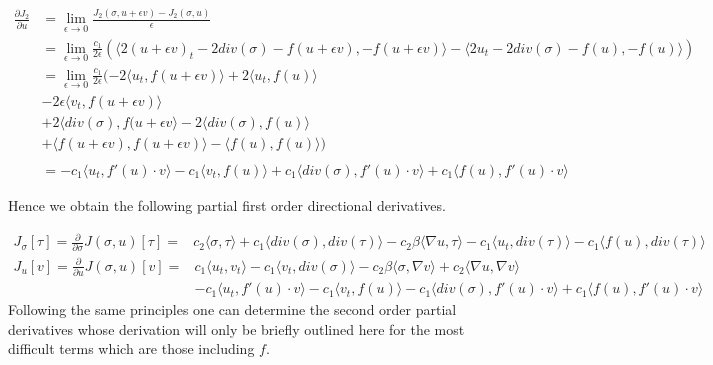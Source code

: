 \documentclass[../draft_1.tex]{subfiles}
\begin{document}
\begin{equation}
\begin{aligned}
\frac{\partial J_2}{\partial u} &= \lim_{\epsilon \rightarrow 0} \frac{J_2(\sigma, u + \epsilon v) - J_2(\sigma, u)}{\epsilon}  \\
&= \lim_{\epsilon \rightarrow 0} \frac{c_1}{2 \epsilon} (\langle 2(u+ \epsilon v)_t - 2 div(\sigma) - f(u + \epsilon v), - f(u + \epsilon v) \rangle - \langle 2u_t - 2 div(\sigma) - f(u), -f(u) \rangle) \\
&= \lim_{\epsilon \rightarrow 0} \frac{c_1}{2 \epsilon}  (-2 \langle u_t, f(u+ \epsilon v) \rangle + 2 \langle u_t, f(u) \rangle \\
& - 2 \epsilon \langle v_t, f(u+ \epsilon v) \rangle \\
&+ 2 \langle div(\sigma), f(u + \epsilon v \rangle - 2 \langle div(\sigma), f(u) \rangle \\
&+ \langle f(u+ \epsilon v), f(u + \epsilon v) \rangle - \langle f(u), f(u) \rangle) \\
\\
&= - c_1 \langle u_t, f'(u) \cdot v \rangle - c_1 \langle v_t, f(u) \rangle + c_1 \langle div(\sigma), f'(u) \cdot v \rangle + c_1 \langle f(u), f'(u) \cdot v \rangle
\end{aligned}
\end{equation}

Hence we obtain the following partial first order directional derivatives. 

\begin{equation}
\begin{aligned}
J_{\sigma}[\tau] = \frac{\partial}{\partial \sigma}J(\sigma, u)[\tau] =& c_2 \langle \sigma, \tau \rangle + c_1 \langle div(\sigma), div(\tau) \rangle - c_2 \beta \langle \nabla u, \tau \rangle - c_1 \langle u_t, div(\tau) \rangle - c_1 \langle f(u), div(\tau) \rangle
\end{aligned}
\end{equation}
\begin{equation}
\begin{aligned}
J_{u} [v]= \frac{\partial}{\partial u} J(\sigma, u)[v] =&  c_1 \langle u_t, v_t \rangle - c_1 \langle v_t, div(\sigma) \rangle - c_2 \beta \langle \sigma, \nabla v \rangle + c_2 \langle \nabla u, \nabla v \rangle  \\  
&- c_1 \langle u_t, f'(u) \cdot v \rangle  - c_1 \langle v_t, f(u) \rangle  - c_1 \langle div(\sigma), f'(u) \cdot v \rangle + c_1 \langle f(u), f'(u) \cdot v \rangle 
\end{aligned}
\end{equation}
Following the same principles one can determine the second order partial derivatives whose derivation will only be briefly outlined here for the most difficult terms which are those including $f$.  
\end{document}
